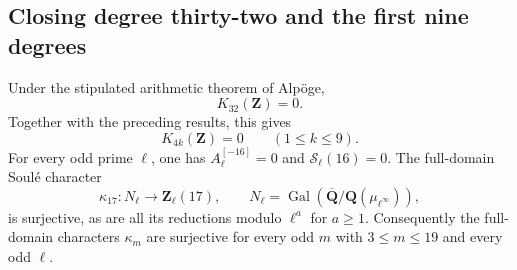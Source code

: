 \subsection{Closing degree thirty-two and the first nine degrees}
\label{sec:k32-vanishing}

\begin{theorem}[K17-K32-VANISH]\label{thm:k32-vanish}
Under the stipulated arithmetic theorem of Alp\"oge,
\[
                         K_{32}(\mathbf Z)=0.
 \tag{K32.1}
\]
Together with the preceding results, this gives
\[
             K_{4k}(\mathbf Z)=0\qquad(1\leq k\leq9).
 \tag{K32.2}
\]
For every odd prime $\ell$, one has
$A_\ell^{[-16]}=0$ and $\mathcal S_\ell(16)=0$.
The full-domain Soul\'e character
\[
 \kappa_{17}:N_\ell\longrightarrow\mathbf Z_\ell(17),
 \qquad N_\ell=\operatorname{Gal}
 (\overline{\mathbf Q}/\mathbf Q(\mu_{\ell^\infty})),
\]
is surjective, as are all its reductions modulo $\ell^a$ for $a\geq1$.
Consequently the full-domain characters $\kappa_m$ are surjective
for every odd $m$ with $3\leq m\leq19$ and every odd $\ell$.
\end{theorem}

